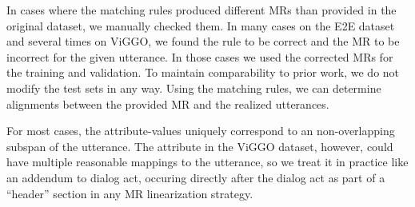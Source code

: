 In cases where the matching rules produced different MRs than provided in the
original dataset, we manually checked them. In many cases on the E2E dataset
and several times on ViGGO, we found the rule to be correct and the MR to be
incorrect for the given utterance. In those cases we used the corrected MRs
for the training and validation. To maintain comparability to prior work, we
do not modify the test sets in any way. Using the matching rules, we can
determine alignments between the provided MR and the realized utterances.

For most cases, the attribute-values uniquely correspond to an non-overlapping
subspan of the utterance. The  attribute in the ViGGO dataset,
however, could have multiple reasonable mappings to the utterance, so we treat
it in practice like an addendum to dialog act, occuring directly after the
dialog act as part of a ``header'' section in any  MR linearization strategy.
